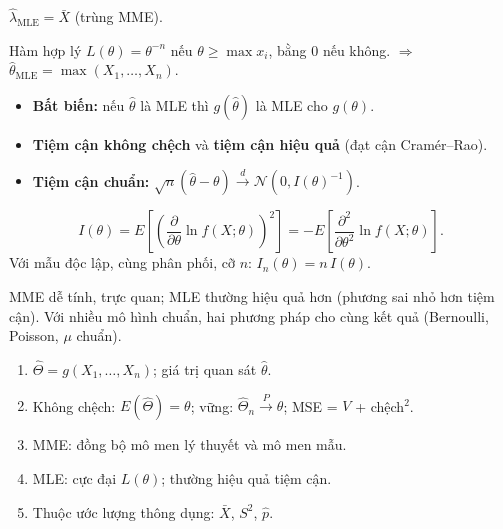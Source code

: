 \documentclass[12pt,a4paper]{article}
\begin{document}
\begin{vidu}[title={MLE cho Poisson$(\lambda)$}]
$\hat{\lambda}_{\text{MLE}} = \bar{X}$ (trùng MME).
\end{vidu}

\begin{vidu}[title={MLE cho $\mathcal{U}(0,\theta)$}]
Hàm hợp lý $L(\theta) = \theta^{-n}$ nếu $\theta \ge \max x_i$, bằng 0 nếu không. $\Rightarrow$ $\hat{\theta}_{\text{MLE}} = \max(X_1,\ldots,X_n)$.
\end{vidu}

\begin{tinhchat}[title={Tính chất MLE (tóm tắt)}]
  \begin{itemize}
    \item \textbf{Bất biến:} nếu $\hat{\theta}$ là MLE thì $g(\hat{\theta})$ là MLE cho $g(\theta)$.
    \item \textbf{Tiệm cận không chệch} và \textbf{tiệm cận hiệu quả} (đạt cận Cramér--Rao).
    \item \textbf{Tiệm cận chuẩn:} $\sqrt{n}(\hat{\theta}-\theta) \xrightarrow{d} \mathcal{N}(0, I(\theta)^{-1})$.
  \end{itemize}
\end{tinhchat}

\begin{congthuc}[title={Thông tin Fisher}]
  \[
    I(\theta) = E\!\left[\left(\dfrac{\partial}{\partial\theta}\ln f(X;\theta)\right)^2\right] = -E\!\left[\dfrac{\partial^2}{\partial\theta^2}\ln f(X;\theta)\right].
  \]
  Với mẫu độc lập, cùng phân phối, cỡ $n$: $I_n(\theta) = n\,I(\theta)$.
\end{congthuc}

\begin{luuy}[title={MME và MLE}]
MME dễ tính, trực quan; MLE thường hiệu quả hơn (phương sai nhỏ hơn tiệm cận). Với nhiều mô hình chuẩn, hai phương pháp cho cùng kết quả (Bernoulli, Poisson, $\mu$ chuẩn).
\end{luuy}

\begin{tongket}[title={Tổng kết}]
\begin{enumerate}
  \item $\hat{\Theta} = g(X_1,\ldots,X_n)$; giá trị quan sát $\hat{\theta}$.
  \item Không chệch: $E(\hat{\Theta})=\theta$; vững: $\hat{\Theta}_n \xrightarrow{P}\theta$; MSE = $V$ + chệch$^2$.
  \item MME: đồng bộ mô men lý thuyết và mô men mẫu.
  \item MLE: cực đại $L(\theta)$; thường hiệu quả tiệm cận.
  \item Thuộc ước lượng thông dụng: $\bar{X}$, $S^2$, $\hat{p}$.
\end{enumerate}
\end{tongket}
\end{document}
